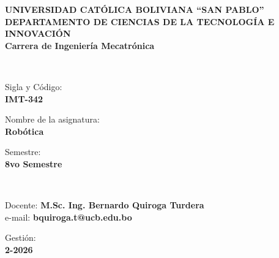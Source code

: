 \documentclass[11pt, letterpaper]{article}
\makeatletter
\newcommand{\sigla}{IMT-342}
\newcommand{\semestre}{8vo Semestre}
\newcommand{\asignatura}{Robótica}
\newcommand{\docente}{M.Sc. Ing. Bernardo Quiroga Turdera}
\newcommand{\correo}{bquiroga.t@ucb.edu.bo}
\newcommand{\gestion}{2-2026}
\makeatother
\begin{document}
\noindent
\begin{minipage}{\linewidth}
    \begin{tcolorbox}[ovalstyle, width=\linewidth]
        \textbf{\Large UNIVERSIDAD CATÓLICA BOLIVIANA ``SAN PABLO''}\\[0.2cm]
        \textbf{\large DEPARTAMENTO DE CIENCIAS DE LA TECNOLOGÍA E INNOVACIÓN}\\[0.2cm]
        \textbf{\large Carrera de Ingeniería Mecatrónica}
    \end{tcolorbox} \\[0.3cm]

    \begin{tcolorbox}[ovalstyle, width=0.195\linewidth]
        Sigla y Código:\\\textbf{\sigla}
    \end{tcolorbox}%
    \hfill%
    \begin{tcolorbox}[ovalstyle, width=0.59\linewidth]
        Nombre de la asignatura:\\\textbf{\asignatura}
    \end{tcolorbox}%
    \hfill%
    \begin{tcolorbox}[ovalstyle, width=0.195\linewidth]
        Semestre:\\\textbf{\semestre}
    \end{tcolorbox} \\[0.15cm]

    \begin{tcolorbox}[ovalstyle, width=0.745\linewidth]
        Docente: \textbf{\docente} \\
        e-mail: \textbf{\correo}
    \end{tcolorbox}%
    \hfill%
    \begin{tcolorbox}[ovalstyle, width=0.245\linewidth]
        Gestión:\\\textbf{\gestion}
    \end{tcolorbox} \\[0.15cm]


\end{minipage}
\end{document}
